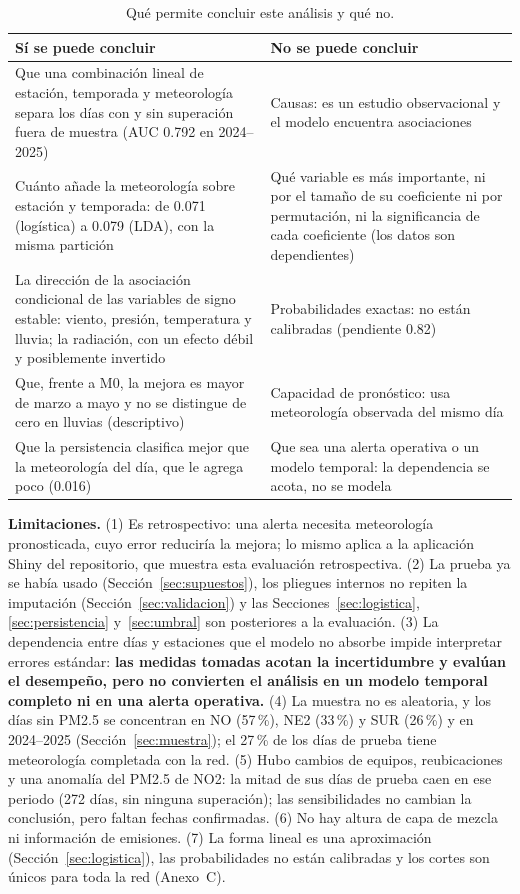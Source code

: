 \begin{table}[!htbp]
\centering\small
\caption{Qué permite concluir este análisis y qué no.}
\label{tbl:concluir}
\begin{tabularx}{\textwidth}{LL}
\toprule
Sí se puede concluir & No se puede concluir\\
\midrule
Que una combinación lineal de estación, temporada y meteorología separa los días con y sin superación fuera de muestra (AUC 0.792 en 2024–2025) & Causas: es un estudio observacional y el modelo encuentra asociaciones\\
Cuánto añade la meteorología sobre estación y temporada: \dauc{} de 0.071 (logística) a 0.079 (LDA), con la misma partición & Qué variable es más importante, ni por el tamaño de su coeficiente ni por permutación, ni la significancia de cada coeficiente (los datos son dependientes)\\
La dirección de la asociación condicional de las variables de signo estable: viento, presión, temperatura y lluvia; la radiación, con un efecto débil y posiblemente invertido & Probabilidades exactas: no están calibradas (pendiente 0.82)\\
Que, frente a M0, la mejora es mayor de marzo a mayo y no se distingue de cero en lluvias (descriptivo) & Capacidad de pronóstico: usa meteorología observada del mismo día\\
Que la persistencia clasifica mejor que la meteorología del día, que le agrega poco (0.016) & Que sea una alerta operativa o un modelo temporal: la dependencia se acota, no se modela\\
\bottomrule
\end{tabularx}
\end{table}

\textbf{Limitaciones.} (1) Es retrospectivo: una alerta necesita meteorología pronosticada, cuyo error reduciría la mejora; lo mismo aplica a la aplicación Shiny del repositorio, que muestra esta evaluación retrospectiva. (2) La prueba ya se había usado (Sección~\ref{sec:supuestos}), los pliegues internos no repiten la imputación (Sección~\ref{sec:validacion}) y las Secciones~\ref{sec:logistica}, \ref{sec:persistencia} y~\ref{sec:umbral} son posteriores a la evaluación. (3) La dependencia entre días y estaciones que el modelo no absorbe impide interpretar errores estándar: \textbf{las medidas tomadas acotan la incertidumbre y evalúan el desempeño, pero no convierten el análisis en un modelo temporal completo ni en una alerta operativa.} (4) La muestra no es aleatoria, y los días sin PM2.5 se concentran en NO (57\,\%), NE2 (33\,\%) y SUR (26\,\%) y en 2024–2025 (Sección~\ref{sec:muestra}); el 27\,\% de los días de prueba tiene meteorología completada con la red. (5) Hubo cambios de equipos, reubicaciones y una anomalía del PM2.5 de NO2: la mitad de sus días de prueba caen en ese periodo (272 días, sin ninguna superación); las sensibilidades no cambian la conclusión, pero faltan fechas confirmadas. (6) No hay altura de capa de mezcla ni información de emisiones. (7) La forma lineal es una aproximación (Sección~\ref{sec:logistica}), las probabilidades no están calibradas y los cortes son únicos para toda la red (Anexo~C).

